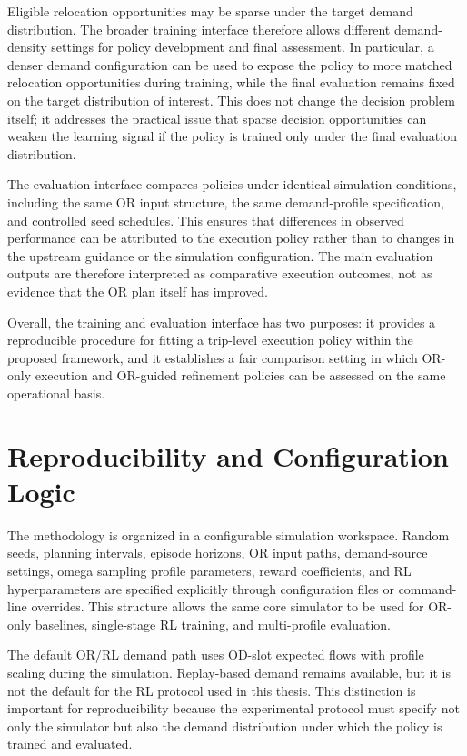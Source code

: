 Eligible relocation opportunities may be sparse under the target demand distribution. The broader training interface therefore allows different demand-density settings for policy development and final assessment. In particular, a denser demand configuration can be used to expose the policy to more matched relocation opportunities during training, while the final evaluation remains fixed on the target distribution of interest. This does not change the decision problem itself; it addresses the practical issue that sparse decision opportunities can weaken the learning signal if the policy is trained only under the final evaluation distribution.

The evaluation interface compares policies under identical simulation conditions, including the same OR input structure, the same demand-profile specification, and controlled seed schedules. This ensures that differences in observed performance can be attributed to the execution policy rather than to changes in the upstream guidance or the simulation configuration. The main evaluation outputs are therefore interpreted as comparative execution outcomes, not as evidence that the OR plan itself has improved.

Overall, the training and evaluation interface has two purposes: it provides a reproducible procedure for fitting a trip-level execution policy within the proposed framework, and it establishes a fair comparison setting in which OR-only execution and OR-guided refinement policies can be assessed on the same operational basis.


\section{Reproducibility and Configuration Logic}

The methodology is organized in a configurable simulation workspace. Random seeds, planning intervals, episode horizons, OR input paths, demand-source settings, omega sampling profile parameters, reward coefficients, and RL hyperparameters are specified explicitly through configuration files or command-line overrides. This structure allows the same core simulator to be used for OR-only baselines, single-stage RL training, and multi-profile evaluation.

The default OR/RL demand path uses OD-slot expected flows with profile scaling during the simulation. Replay-based demand remains available, but it is not the default for the RL protocol used in this thesis. This distinction is important for reproducibility because the experimental protocol must specify not only the simulator but also the demand distribution under which the policy is trained and evaluated.

